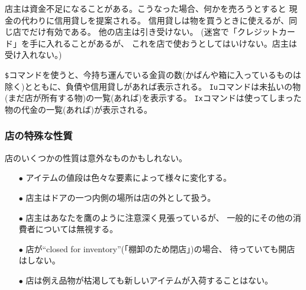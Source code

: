 店主は資金不足になることがある。こうなった場合、何かを売ろうとすると
現金の代わりに信用貸しを提案される。
信用貸しは物を買うときに使えるが、同じ店でだけ有効である。
他の店主は引き受けない。
(迷宮で「クレジットカード」を手に入れることがあるが、
これを店で使おうとしてはいけない。店主は受け入れない。)

{\tt \$}コマンドを使うと、今持ち運んでいる金貨の数(かばんや箱に入っているものは
除く)とともに、負債や信用貸しがあれば表示される。
{\tt Iu}コマンドは未払いの物(まだ店が所有する物)の一覧(あれば)を表示する。
{\tt Ix}コマンドは使ってしまった物の代金の一覧(あれば)が表示される。

\subsubsection*{店の特殊な性質}

店のいくつかの性質は意外なものかもしれない。

\begin{itemize}
\item[$\bullet$]
アイテムの値段は色々な要素によって様々に変化する。
\item[$\bullet$]
店主はドアの一つ内側の場所は店の外として扱う。
\item[$\bullet$]
店主はあなたを鷹のように注意深く見張っているが、
一般的にその他の消費者については無視する。
\item[$\bullet$]
店が``closed for inventory''(「棚卸のため閉店」)の場合、
待っていても開店はしない。
\item[$\bullet$]
店は例え品物が枯渇しても新しいアイテムが入荷することはない。
\end{itemize}

